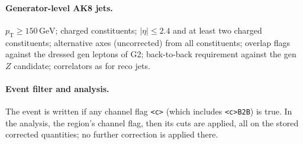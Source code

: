 \documentclass[11pt]{article}
\newcommand{\pt}{p_{\mathrm{T}}}
\newcommand{\GeV}{\ensuremath{\,\mathrm{GeV}}}
\newcommand{\code}[1]{\texttt{#1}}
\begin{document}
\paragraph{Generator-level AK8 jets.} $\pt \geq 150\GeV$; charged constituents; $|\eta| \leq 2.4$ and at least two
charged constituents; alternative axes (uncorrected) from all constituents;
overlap flags against the dressed gen leptons of G2; back-to-back requirement against the gen $Z$ candidate;
correlators as for reco jets.

\paragraph{Event filter and analysis.} The event is written if any channel flag \code{<c>} (which includes
\code{<c>B2B}) is true. In the analysis, the region's channel flag, then its cuts are applied, all on the stored
corrected quantities; no further correction is applied there.
\end{document}

